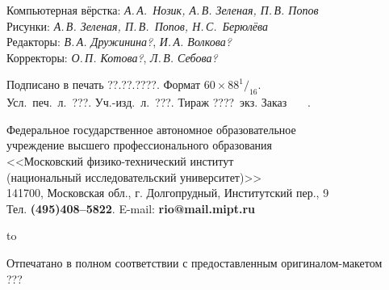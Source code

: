 {\footnotesize\raggedright

Компьютерная вёрстка: {\it А.\,А.~Нозик, А.\,В. Зеленая, П.\,В. Попов}\\
Рисунки: {\it А.\,В. Зеленая, П.\,В.~Попов, Н.\,С.~Берюлёва}\\
Редакторы: {\it В.\,А. Дружинина?}, {\it И.\,А. Волкова?}\\
Корректоры: {\it О.\,П. Котова?}, {\it Л.\,В. Себова?}

\bigskip

Подписано в печать ??.??.????. Формат $60\times88^1{/}_{16}$.\\
Усл.~печ.~л.~???. Уч.-изд.~л.~???. Тираж ????~экз. Заказ \No~~~.

\bigskip

Федеральное государственное автономное образовательное\\
учреждение высшего профессионального образования\\
<<Московский физико-технический институт\\
(национальный исследовательский университет)>>\\
141700, Московская обл., г. Долгопрудный, Институтский пер., 9\\
Тел. {\bf (495)408--5822}. E-mail: {\bf rio@mail.mipt.ru}

\medskip

\hfil \hbox to \textwidth{\hrulefill}\par

Отпечатано в полном соответствии с предоставленным оригиналом-макетом\\
???


}

